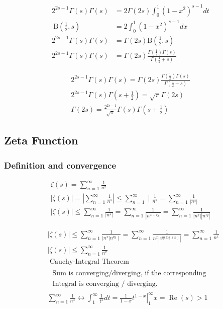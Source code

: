	$$
	\begin{aligned}
		2^{2 s-1} \Gamma(s) \Gamma(s) & =2 \Gamma(2 s) \int_0^1\left(1-x^2\right)^{s-1} d t \\
		\mathrm{~B}\left(\frac{1}{2}, s\right) & =2 \int_0^1\left(1-x^2\right)^{s-1} d x \\
		2^{2 s-1} \Gamma(s) \Gamma(s) & =\Gamma(2 s) \mathrm{B}\left(\frac{1}{2}, s\right) \\
		2^{2 s-1} \Gamma(s) \Gamma(s) & =\Gamma(2 s) \frac{\Gamma\left(\frac{1}{2}\right) \Gamma(s)}{\Gamma\left(\frac{1}{2}+s\right)}
	\end{aligned}
	$$
	
	$$
	\begin{gathered}
		2^{2 s-1} \Gamma(s) \Gamma(s)=\Gamma(2 s) \frac{\Gamma\left(\frac{1}{2}\right) \Gamma(s)}{\Gamma\left(\frac{1}{2}+s\right)} \\
		2^{2 s-1} \Gamma(s) \Gamma\left(s+\frac{1}{2}\right)=\sqrt{\pi} \Gamma(2 s) \\
		\Gamma(2 s)=\frac{2^{2 s-1}}{\sqrt{\pi}} \Gamma(s) \Gamma\left(s+\frac{1}{2}\right)
	\end{gathered}
	$$
	
	
	\subsection{Zeta Function}
	\subsubsection{Definition and convergence}
	
	$$
	\begin{gathered}
		\zeta(s)=\sum_{n=1}^{\infty} \frac{1}{n^s} \\
		|\zeta(s)|=\left|\sum_{n=1}^{\infty} \frac{1}{n^s}\right| \leq \sum_{n=1}^{\infty} \mid \frac{1}{n^s}=\sum_{n=1}^{\infty} \frac{1}{\left|n^s\right|} \\
		|\zeta(s)| \leq \sum_{n=1}^{\infty} \frac{1}{\left|n^s\right|}=\sum_{n=1}^{\infty} \frac{1}{\left|n^{x+i y}\right|}=\sum_{n=1}^{\infty} \frac{1}{\left|n^x\right|\left|n^{i y}\right|}
	\end{gathered}
	$$
	
	$$
	\begin{aligned}
		& |\zeta(s)| \leq \sum_{n=1}^{\infty} \frac{1}{\left|n^x\right| n^{i y} \mid}=\sum_{n=1}^{\infty} \frac{1}{n^x\left|e^{i y \log (n)}\right|}=\sum_{n=1}^{\infty} \frac{1}{n^x} \\
		& |\zeta(s)| \leq \sum_{n=1}^{\infty} \frac{1}{n^x} \\
		& \text { Cauchy-Integral Theorem } \\
		& \begin{array}{l}
			\text { Sum is converging/diverging, if the corresponding } \\
			\text { Integral is converging / diverging. }
		\end{array} \\
		& \sum_{n=1}^{\infty} \frac{1}{n^x} \leftrightarrow \int_1^{\infty} \frac{1}{t^x} d t=\left.\frac{1}{1-x} t^{1-x}\right|_1 ^{\infty} x=\operatorname{Re}(s)>1 \\
		&
	\end{aligned}
	$$
	
